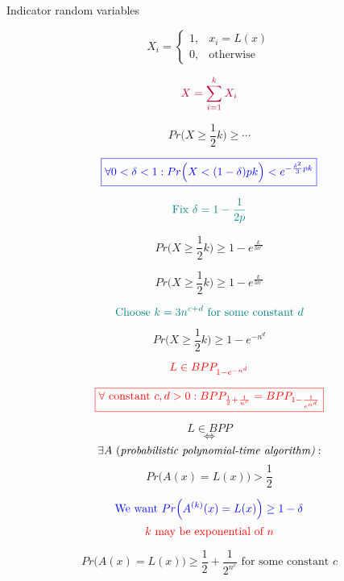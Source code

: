\begin{frame}
  \centerline{Indicator random variables} 
  \[
	X_i = \begin{cases}
	  1, & x_i = L(x) \\
	  0, & \text{otherwise}
	\end{cases}
  \]

  \pause
  \[
	\textcolor{purple}{X = \sum_{i=1}^{k} X_i}
  \]

  \pause
  \[
	Pr\Big(X \ge \frac{1}{2} k \Big) \ge \cdots
  \]

  \pause
  \[
	\textcolor{blue}{\boxed{\forall 0 < \delta < 1: Pr\Big(X < (1-\delta)pk\Big) < e^{-\frac{\delta^2}{3}pk}}}
  \]

  \pause
  \[
	\textcolor{teal}{\text{Fix } \delta = 1 - \frac{1}{2p}}
  \]

  \pause
  \[
	Pr\Big(X \ge \frac{1}{2} k \Big) \ge 1 - e^{\frac{k}{3n^c}}
  \]
\end{frame}
\begin{frame}
  \[
	Pr\Big(X \ge \frac{1}{2} k \Big) \ge 1 - e^{\frac{k}{3n^c}}
  \]

  \pause
  \[
	\textcolor{teal}{\text{Choose } k = 3n^{c+d} \text{ for some constant } d}
  \]

  \pause
  \[
	Pr\Big(X \ge \frac{1}{2} k \Big) \ge 1 - e^{-n^{d}}
  \]

  \pause
  \[
	\textcolor{red}{L \in BPP_{1 - e^{-n^d}}}
  \]

  \pause
  \[
	\textcolor{red}{\boxed{\forall \text{ constant } c, d > 0: BPP_{\frac{1}{2} + \frac{1}{n^c}} = BPP_{1-\frac{1}{e^{n^d}}}}}
  \]
\end{frame}

\begin{frame}
  \begin{definition}
	\[
	  L \in BPP
	\]
	\[
	  \iff
	\]
	\[
	  \exists A \text{ (\it probabilistic polynomial-time algorithm)}: 
	\]
	\[
	  Pr\Big(A(x) = L(x)\Big) > \frac{1}{2}
	\]
  \end{definition}

  \pause
  \[
	\textcolor{blue}{\text{We want } Pr\Big(A^{(k)}(x) = L(x)\Big) \ge 1 - \delta}
  \]
  \[
	\textcolor{red}{k \text{ may be exponential of } n}
  \]

  \pause
  \[
	Pr\Big(A(x) = L(x)\Big) \ge \frac{1}{2} + \frac{1}{2^{n^{c}}} \text{ for some constant } c
  \]
\end{frame}

